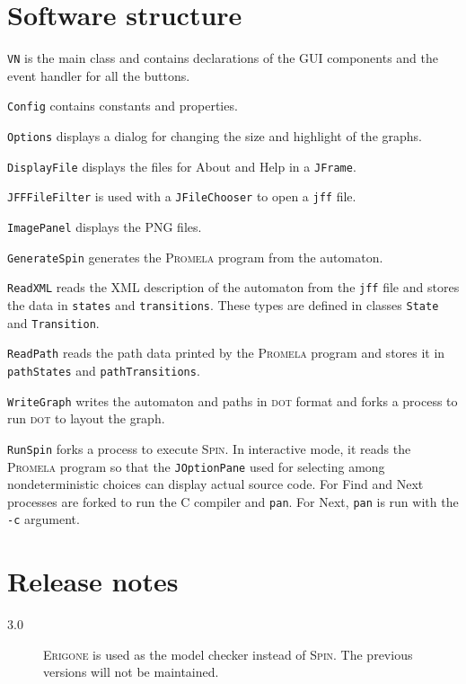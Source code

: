 \documentclass[11pt]{article}
\newcommand{\dt}{\textsc{dot}}
\newcommand{\spn}{\textsc{Spin}}
\newcommand{\prm}{\textsc{Promela}}
\newcommand{\erg}{\textsc{Erigone}}
\newcommand{\p}[1]{\texttt{#1}}
\newcommand{\bu}[1]{\textsf{#1}}
\begin{document}
\section{Software structure}
\p{VN} is the main class and contains declarations
of the GUI components and the event handler for all the buttons.

\p{Config} contains constants and properties.

\p{Options} displays a dialog for changing the size and highlight of the graphs.

\p{DisplayFile} displays the files for \bu{About} and \bu{Help}
in a \p{JFrame}.

\p{JFFFileFilter} is used with a \p{JFileChooser} to open a \p{jff} file.

\p{ImagePanel} displays the \textsc{PNG} files.

\p{GenerateSpin} generates the \prm{} program from the automaton.

\p{ReadXML} reads the XML description of the automaton from the \p{jff} file and
stores the data in \p{states} and \p{transitions}. These types are defined in
classes \p{State} and \p{Transition}.

\p{ReadPath} reads the path data printed by the \prm{} program and stores it in
\p{pathStates} and \p{pathTransitions}.

\p{WriteGraph} writes the automaton and paths in \dt{} format and forks a process to
run \dt{} to layout the graph.

\p{RunSpin} forks a process to execute \spn{}. In interactive mode, it reads the
\prm{} program so that the \p{JOptionPane} used for selecting among
nondeterministic choices can display actual source code. For \bu{Find} and
\bu{Next} processes are forked to run the C compiler and \p{pan}. 
For \bu{Next}, \p{pan} is run with the \p{-c} argument.

\appendix

\section{Release notes}

\begin{description}
\item[3.0] \erg{} is used as the model checker instead of \spn{}.
The previous versions will not be maintained.
\end{description}
\end{document}

